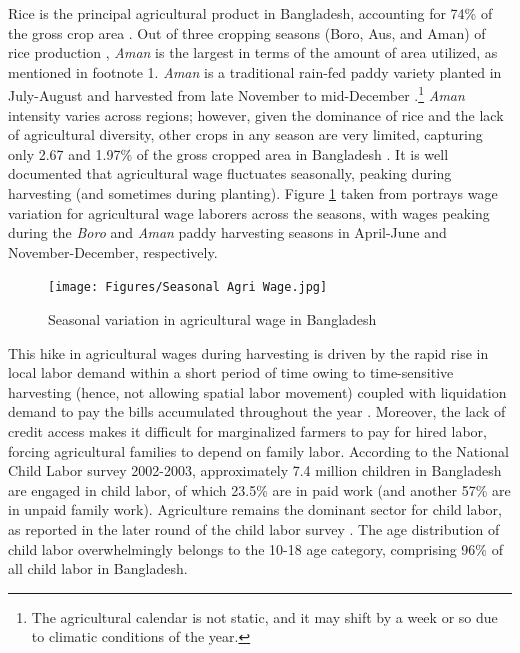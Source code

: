 \documentclass[12pt,letterpaper]{article}
\newcommand{\0}{\ensuremath{\mbox{\boldmath $0$}}}
\begin{document}
Rice is the principal agricultural product in Bangladesh, accounting for 74\% of the gross crop area \citep{tisdell2019agricultural}. Out of three cropping seasons (Boro, Aus, and Aman) of rice production \citep{laborte2017riceatlas}, \textit{Aman} is the largest in terms of the amount of area utilized, as mentioned in footnote 1. \textit{Aman} is a traditional rain-fed paddy variety planted in July-August and harvested from late November to mid-December \citep{shelley2016rice}.\footnote{The agricultural calendar is not static, and it may shift by a week or so due to climatic conditions of the year.} \textit{Aman} intensity varies across regions; however, given the dominance of rice and the lack of agricultural diversity, other crops in any season are very limited, capturing only 2.67 and 1.97\% of the gross cropped area in Bangladesh \citep{tisdell2019agricultural}. It is well documented that agricultural wage fluctuates seasonally, peaking during harvesting (and sometimes during planting). Figure \ref{wage} taken from \citet{rahman1988labour} portrays wage variation for agricultural wage laborers across the seasons, with wages peaking during the \textit{Boro} and \textit{Aman} paddy harvesting seasons in April-June and November-December, respectively.

\begin{figure}[h!]
\centering
\texttt{[image: Figures/Seasonal Agri Wage.jpg]}\\
\caption{Seasonal variation in agricultural wage in Bangladesh}
\label{wage}
\end{figure}

This hike in agricultural wages during harvesting is driven by the rapid rise in local labor demand within a short period of time owing to time-sensitive harvesting (hence, not allowing spatial labor movement) coupled with liquidation demand to pay the bills accumulated throughout the year \citep{burke2019sell}. Moreover, the lack of credit access makes it difficult for marginalized farmers to pay for hired labor, forcing agricultural families to depend on family labor. According to the \cite{bbs2003report} National Child Labor survey 2002-2003, approximately 7.4 million children in Bangladesh are engaged in child labor, of which 23.5\% are in paid work (and another 57\% are in unpaid family work). Agriculture remains the dominant sector for child labor, as reported in the later round of the child labor survey \cite{bbs2013report}. The age distribution of child labor overwhelmingly belongs to the 10-18 age category, comprising 96\% of all child labor in Bangladesh.
\end{document}
